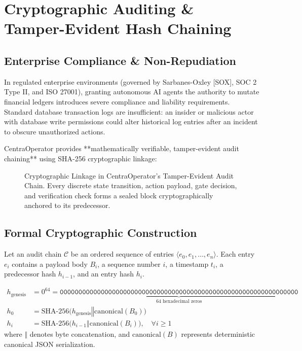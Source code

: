 \section{Cryptographic Auditing \& Tamper-Evident Hash Chaining}
\label{sec:audit_cryptography}

\subsection{Enterprise Compliance \& Non-Repudiation}
In regulated enterprise environments (governed by Sarbanes-Oxley [SOX], SOC 2 Type II, and ISO 27001), granting autonomous AI agents the authority to mutate financial ledgers introduces severe compliance and liability requirements. Standard database transaction logs are insufficient: an insider or malicious actor with database write permissions could alter historical log entries after an incident to obscure unauthorized actions.

CentraOperator provides **mathematically verifiable, tamper-evident audit chaining** using SHA-256 cryptographic linkage:

\begin{figure}[htbp]
  \centering
  
  \caption{Cryptographic Linkage in CentraOperator's Tamper-Evident Audit Chain. Every discrete state transition, action payload, gate decision, and verification check forms a sealed block cryptographically anchored to its predecessor.}
  \label{fig:audit_chain}
\end{figure}

\subsection{Formal Cryptographic Construction}
Let an audit chain $\mathcal{C}$ be an ordered sequence of entries $\langle e_0, e_1, \dots, e_n \rangle$. Each entry $e_i$ contains a payload body $B_i$, a sequence number $i$, a timestamp $t_i$, a predecessor hash $h_{i-1}$, and an entry hash $h_i$.

\begin{auditbox}
\begin{align}
  h_{\text{genesis}} &= 0^{64} = \underbrace{\texttt{0000000000000000000000000000000000000000000000000000000000000000}}_{64\text{ hexadecimal zeros}} \\
  h_0 &= \text{SHA-256}\Big( h_{\text{genesis}} \mathbin{\Vert} \text{canonical}(B_0) \Big) \\
  h_i &= \text{SHA-256}\Big( h_{i-1} \mathbin{\Vert} \text{canonical}(B_i) \Big), \quad \forall i \ge 1
\end{align}
where $\mathbin{\Vert}$ denotes byte concatenation, and $\text{canonical}(B)$ represents deterministic canonical JSON serialization.
\end{auditbox}

